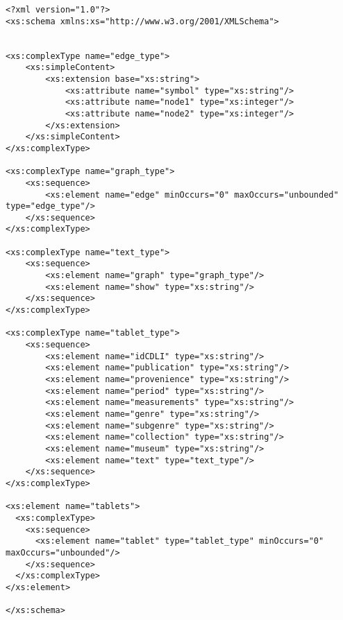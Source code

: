 \begin{verbatim}
<?xml version="1.0"?>
<xs:schema xmlns:xs="http://www.w3.org/2001/XMLSchema">


<xs:complexType name="edge_type">
	<xs:simpleContent>
		<xs:extension base="xs:string">
			<xs:attribute name="symbol" type="xs:string"/>
			<xs:attribute name="node1" type="xs:integer"/>
			<xs:attribute name="node2" type="xs:integer"/>
		</xs:extension>
	</xs:simpleContent>
</xs:complexType>

<xs:complexType name="graph_type">
	<xs:sequence>
		<xs:element name="edge" minOccurs="0" maxOccurs="unbounded" type="edge_type"/>
	</xs:sequence>
</xs:complexType>

<xs:complexType name="text_type">
	<xs:sequence>
		<xs:element name="graph" type="graph_type"/>
		<xs:element name="show" type="xs:string"/>
	</xs:sequence>
</xs:complexType>

<xs:complexType name="tablet_type">
	<xs:sequence>
		<xs:element name="idCDLI" type="xs:string"/>
		<xs:element name="publication" type="xs:string"/>
		<xs:element name="provenience" type="xs:string"/>
		<xs:element name="period" type="xs:string"/>
		<xs:element name="measurements" type="xs:string"/>
		<xs:element name="genre" type="xs:string"/>
		<xs:element name="subgenre" type="xs:string"/>
		<xs:element name="collection" type="xs:string"/>
		<xs:element name="museum" type="xs:string"/>
		<xs:element name="text" type="text_type"/>		
	</xs:sequence>
</xs:complexType>

<xs:element name="tablets">
  <xs:complexType>
    <xs:sequence>
      <xs:element name="tablet" type="tablet_type" minOccurs="0" maxOccurs="unbounded"/>
    </xs:sequence>
  </xs:complexType>
</xs:element>

</xs:schema>
\end{verbatim}